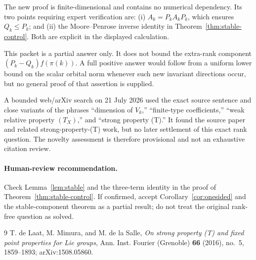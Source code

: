 \documentclass[11pt]{article}
\begin{document}
The new proof is finite-dimensional and contains no numerical dependency.  Its two points requiring expert verification are: (i) $A_k=P_kA_kP_k$, which ensures $Q_k\leq P_k$; and (ii) the Moore--Penrose inverse identity in Theorem~\ref{thm:stable-control}.  Both are explicit in the displayed calculation.

This packet is a partial answer only.  It does not bound the extra-rank component $ (P_k-Q_k)f(\pi(k))$.  A full positive answer would follow from a uniform lower bound on the scalar orbital norm whenever such new invariant directions occur, but no general proof of that assertion is supplied.

A bounded web/arXiv search on 21 July 2026 used the exact source sentence and close variants of the phrases ``dimension of $V_k$,'' ``finite-type coefficients,'' ``weak relative property $(T_X)$,'' and ``strong property (T).''  It found the source paper and related strong-property-(T) work, but no later settlement of this exact rank question.  The novelty assessment is therefore provisional and not an exhaustive citation review.

\paragraph{Human-review recommendation.}
Check Lemma~\ref{lem:stable} and the three-term identity in the proof of Theorem~\ref{thm:stable-control}.  If confirmed, accept Corollary~\ref{cor:onesided} and the stable-component theorem as a partial result; do not treat the original rank-free question as solved.

\begin{thebibliography}{9}
T. de Laat, M. Mimura, and M. de la Salle,
\emph{On strong property (T) and fixed point properties for Lie groups},
Ann. Inst. Fourier (Grenoble) \textbf{66} (2016), no.~5, 1859--1893;
arXiv:1508.05860.
\end{thebibliography}
\end{document}
